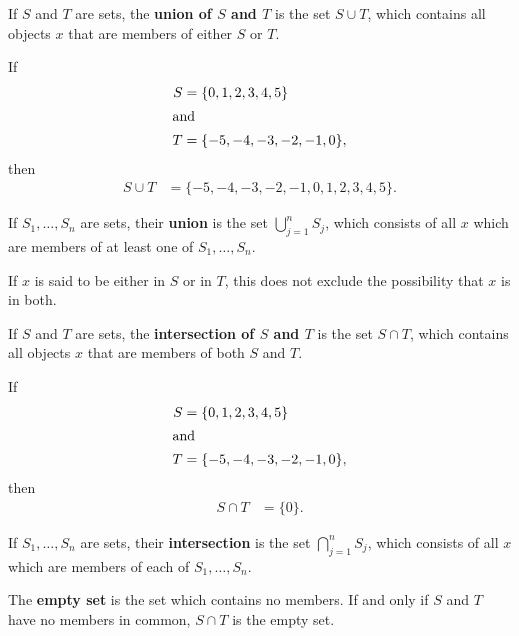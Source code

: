 \documentclass[12pt]{article}
\begin{document}
\begin{defn}
  If $S$ and $T$ are sets, the \textbf{union of $S$ and $T$} is the set $S \cup T$,
  which contains all objects $x$ that are members of either $S$ or $T$.

  \begin{exm}
    If
    \begin{align*}
      S &= \{0,1,2,3,4,5\}\\
      \shortintertext{and}
      T &= \{-5,-4,-3,-2,-1,0\},
    \end{align*}
    then
    \begin{align*}
      S \cup T &= \{-5,-4,-3,-2,-1,0,1,2,3,4,5\}.
    \end{align*}
  \end{exm}

  If $S_1,\ldots,S_n$ are sets, their \textbf{union} is the set $\bigcup_{j =
  1}^{n}S_j$, which consists of all $x$ which are members of at least one of
  $S_1,\ldots,S_n$.
\end{defn}

\begin{comm}
  If $x$ is said to be either in $S$ or in $T$, this does not exclude the possibility
  that $x$ is in both.
\end{comm}

\begin{defn}
  If $S$ and $T$ are sets, the \textbf{intersection of $S$ and $T$} is the set $S
  \cap T$, which contains all objects $x$ that are members of both $S$ and $T$.

  \begin{exm}
    If
    \begin{align*}
      S &= \{0,1,2,3,4,5\}\\
      \shortintertext{and}
      T &= \{-5,-4,-3,-2,-1,0\},
    \end{align*}
    then
    \begin{align*}
      S \cap T &= \{0\}.
    \end{align*}
  \end{exm}

  If $S_1,\ldots,S_n$ are sets, their \textbf{intersection} is the set $\bigcap_{j =
  1}^{n}S_j$, which consists of all $x$ which are members of each of
  $S_1,\ldots,S_n$.
\end{defn}

\begin{defn}
  The \textbf{empty set} is the set which contains no members. If and only if $S$ and
  $T$ have no members in common, $S \cap T$ is the empty set.
\end{defn}
\end{document}
